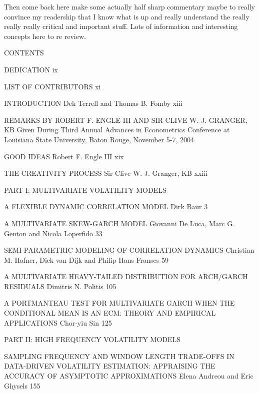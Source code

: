 Then come back here make some actually half sharp commentary maybe to really convince my readership that I know what is up and really understand the really really really critical and important stuff. Lots of information and interesting concepts here to re review.

CONTENTS



DEDICATION ix



LIST OF CONTRIBUTORS xi



INTRODUCTION
Dek Terrell and Thomas B. Fomby xiii



REMARKS BY ROBERT F. ENGLE III AND
SIR CLIVE W. J. GRANGER, KB
Given During Third Annual Advances in Econometrics
Conference at Louisiana State University, Baton
Rouge, November 5-7, 2004



GOOD IDEAS
Robert F. Engle III xix



THE CREATIVITY PROCESS
Sir Clive W. J. Granger, KB xxiii



PART I: MULTIVARIATE VOLATILITY MODELS



A FLEXIBLE DYNAMIC CORRELATION MODEL
Dirk Baur 3



A MULTIVARIATE SKEW-GARCH MODEL
Giovanni De Luca, Marc G. Genton and Nicola Loperfido 33



SEMI-PARAMETRIC MODELING OF CORRELATION DYNAMICS
Christian M. Hafner, Dick van Dijk and Philip Hans Franses 59



A MULTIVARIATE HEAVY-TAILED DISTRIBUTION FOR ARCH/GARCH RESIDUALS
Dimitris N. Politis 105



A PORTMANTEAU TEST FOR MULTIVARIATE GARCH WHEN THE CONDITIONAL MEAN IS AN ECM: THEORY AND EMPIRICAL APPLICATIONS
Chor-yiu Sin 125



PART II: HIGH FREQUENCY VOLATILITY MODELS



SAMPLING FREQUENCY AND WINDOW LENGTH TRADE-OFFS IN DATA-DRIVEN VOLATILITY ESTIMATION: APPRAISING THE ACCURACY OF ASYMPTOTIC APPROXIMATIONS
Elena Andreou and Eric Ghysels 155



